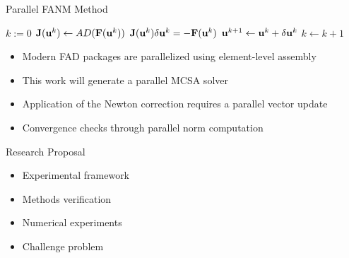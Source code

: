 \documentclass{beamer}
\begin{document}
\begin{frame}{Parallel FANM Method}

  \begin{algorithm}[H]
    \begin{algorithmic}[1]
      \STATE $k := 0$ 
      \STATE $\mathbf{J}(\mathbf{u}^{k}) \leftarrow AD(\mathbf{F}(\mathbf{u}^k))$ 
      \STATE $\mathbf{J}(\mathbf{u}^k) \delta \mathbf{u}^k = -\mathbf{F}(\mathbf{u}^{k})$
      \STATE $\mathbf{u}^{k+1} \leftarrow \mathbf{u}^k + \delta \mathbf{u}^k$ 
      \STATE $k \leftarrow k+1$ 
      \ENDWHILE
    \end{algorithmic}
    \caption{FANM}
  \end{algorithm}

  \begin{itemize}
  \item Modern FAD packages are parallelized using element-level
    assembly
  \item This work will generate a parallel MCSA solver
  \item Application of the Newton correction requires a parallel
    vector update
  \item Convergence checks through parallel norm computation
  \end{itemize}

\end{frame}

\begin{frame}{Research Proposal}

  \begin{itemize}
  \item Experimental framework
  \item Methods verification
  \item Numerical experiments
  \item Challenge problem
  \end{itemize}

\end{frame}
\end{document}
